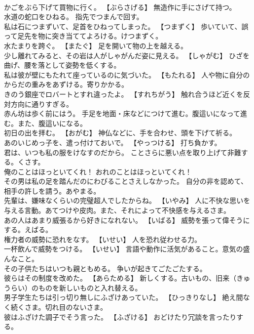 \documentclass[8pt]{extreport}
\begin{document}
\begin{CJK}{UTF8}{min}
\\	かごをぶら下げて買物に行く。	【ぶらさげる】 無造作に手にさげて持つ。
\\	水道の蛇口をひねる。	指先でつまんで回す。
\\	私は石につまずいて、足首をひねってしまった。	【つまずく】 歩いていて、誤って足先を物に突き当ててよろける。けつまずく。
\\	水たまりを跨ぐ。	【またぐ】 足を開いて物の上を越える。
\\	少し離れてみると、その岩は人がしゃがんだ姿に見える。	【しゃがむ】 ひざを曲げ、腰を落として姿勢を低くする。
\\	私は彼が壁にもたれて座っているのに気づいた。	【もたれる】 人や物に自分のからだの重みをあずける。寄りかかる。
\\	きのう銀座でロバートとすれ違ったよ。	【すれちがう】 触れ合うほど近くを反対方向に通りすぎる。
\\	赤ん坊は歩く前にはう。	手足を地面・床などにつけて進む。腹這いになって進む。また、腹這いになる。
\\	初日の出を拝む。	【おがむ】 神仏などに、手を合わせ、頭を下げて祈る。
\\	あのいじめっ子を、遣っ付けておいで。	【やっつける】 打ち負かす。
\\	君は、いつも私の服をけなすのだから。	ことさらに悪い点を取り上げて非難する。くさす。
\\	俺のことはほっといてくれ！	おれのことはほっといてくれ！ 
\\	その男は私の足を踏んだのにわびることさえしなかった。	自分の非を認めて、相手の許しを請う。あやまる。
\\	先輩は、嫌味なくらいの完璧超人でしたからね。	【いやみ】 人に不快な思いを与える言動。あてつけや皮肉。また、それによって不快感を与えるさま。
\\	あの人はあまり威張るから好きになれない。	【いばる】 威勢を張って偉そうにする。えばる。
\\	権力者の威勢に恐れをなす。	【いせい】 人を恐れ従わせる力。
\\	一杯飲んで威勢をつける。	【いせい】 言語や動作に活気があること。意気の盛んなこと。
\\	その子供たちはいつも親ともめる。	争いが起きてごたごたする。
\\	彼らはその制度を改めた。	【あらためる】 新しくする。古いもの、旧来（きゅうらい）のものを新しいものと入れ替える。
\\	男子学生たちは引っ切り無しにふざけあっていた。	【ひっきりなし】 絶え間なく続くさま。切れ目のないさま。
\\	彼はふざけた調子でそう言った。	【ふざける】 おどけたり冗談を言ったりする。

\end{CJK}
\end{document}
